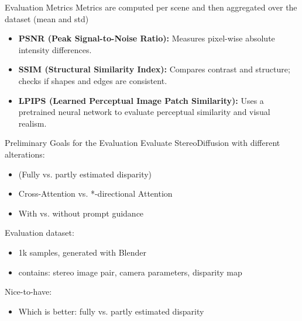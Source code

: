 \begin{frame}{Evaluation Metrics}
    Metrics are computed per scene and then aggregated over the dataset (mean and std)
    
    \bigskip
    \begin{itemize}
        \item \textbf{PSNR (Peak Signal-to-Noise Ratio):} 
        Measures pixel-wise absolute intensity differences.
        
        \item \textbf{SSIM (Structural Similarity Index):} 
        Compares contrast and structure; checks if shapes and edges are consistent.
        
        \item \textbf{LPIPS (Learned Perceptual Image Patch Similarity):} 
        Uses a pretrained neural network to evaluate perceptual similarity and visual realism.
    \end{itemize}
    
    
\end{frame}

\begin{frame}{Preliminary Goals for the Evaluation}
    Evaluate StereoDiffusion with different alterations:
    \begin{itemize}
        \item (Fully vs. partly estimated disparity)
        \item Cross-Attention vs. *-directional Attention
        \item With vs. without prompt guidance
    \end{itemize}
    \bigskip
    Evaluation dataset:
    \begin{itemize}
        \item 1k samples, generated with Blender
        \item contains: stereo image pair, camera parameters, disparity map
    \end{itemize}
    \bigskip
    Nice-to-have:
    \begin{itemize}
        \item Which is better: fully vs. partly estimated disparity
    \end{itemize}
\end{frame}